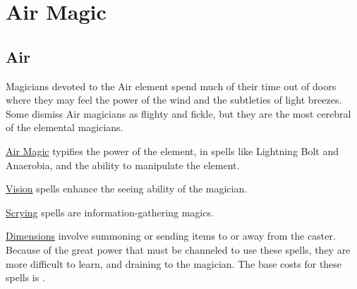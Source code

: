 \chapter{Air Magic}
\label{Ch:elemental-air-magic}

\section{Air}

Magicians devoted to the Air element spend much of their time out of doors where they may feel the power of the wind and the subtleties of light breezes. Some dismiss Air magicians as flighty and fickle, but they are the most cerebral of the elemental magicians.

\ul{Air Magic} typifies the power of the element, in spells like Lightning Bolt and Anaerobia, and the ability to manipulate the element.

\ul{Vision} spells enhance the seeing ability of the magician.

\ul{Scrying} spells are information-gathering magics.

\ul{Dimensions} involve summoning or sending items to or away from the caster. Because of the great power that must be channeled to use these spells, they are more difficult to learn, and draining to the magician. The base costs for these spells is .


